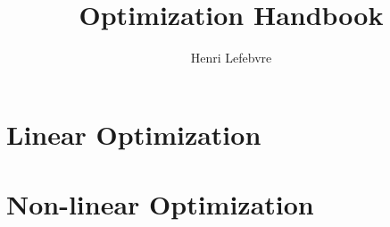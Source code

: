 \documentclass[twocolumn]{report}
\title{Optimization Handbook}
\author{Henri Lefebvre}
\begin{document}
    \maketitle
    \tableofcontents

    \part{Linear Optimization}
    
    
    
    
    
    
    
    
    

    \part{Non-linear Optimization}

    \begin{appendices}
        
    \end{appendices}

    
     
\end{document}
